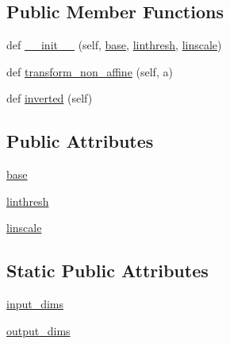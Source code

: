 \subsection*{Public Member Functions}
\begin{DoxyCompactItemize}
\item 
def \hyperlink{classmatplotlib_1_1scale_1_1SymmetricalLogTransform_a04ea5fa84e092a4375ea1986134fadf6}{\+\_\+\+\_\+init\+\_\+\+\_\+} (self, \hyperlink{classmatplotlib_1_1scale_1_1SymmetricalLogTransform_a5054607f76f76c8a47c711818de957d3}{base}, \hyperlink{classmatplotlib_1_1scale_1_1SymmetricalLogTransform_a0c040845c07e662b849ebc10273dad65}{linthresh}, \hyperlink{classmatplotlib_1_1scale_1_1SymmetricalLogTransform_ad4975ccea3aa795592f214f502442268}{linscale})
\item 
def \hyperlink{classmatplotlib_1_1scale_1_1SymmetricalLogTransform_a9cb340849fb881a7051a871652319071}{transform\+\_\+non\+\_\+affine} (self, a)
\item 
def \hyperlink{classmatplotlib_1_1scale_1_1SymmetricalLogTransform_a9c55c46706c75c9d5ffcba082da9ab04}{inverted} (self)
\end{DoxyCompactItemize}
\subsection*{Public Attributes}
\begin{DoxyCompactItemize}
\item 
\hyperlink{classmatplotlib_1_1scale_1_1SymmetricalLogTransform_a5054607f76f76c8a47c711818de957d3}{base}
\item 
\hyperlink{classmatplotlib_1_1scale_1_1SymmetricalLogTransform_a0c040845c07e662b849ebc10273dad65}{linthresh}
\item 
\hyperlink{classmatplotlib_1_1scale_1_1SymmetricalLogTransform_ad4975ccea3aa795592f214f502442268}{linscale}
\end{DoxyCompactItemize}
\subsection*{Static Public Attributes}
\begin{DoxyCompactItemize}
\item 
\hyperlink{classmatplotlib_1_1scale_1_1SymmetricalLogTransform_a12e3a2804993a293835d0b09a737b259}{input\+\_\+dims}
\item 
\hyperlink{classmatplotlib_1_1scale_1_1SymmetricalLogTransform_aa7feccd4f746f111444d699fa345ea07}{output\+\_\+dims}
\end{DoxyCompactItemize}


